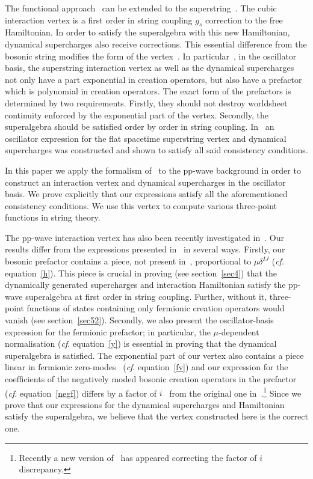 \documentclass[12pt]{article}
\def\m{\mu}
\numberwithin{equation}{section} \setlength{\textwidth}{17cm}
\begin{document}
\noindent The functional approach~\cite{Mand,KK} can be extended to the superstring~\cite{Mandsusy,gs,gsb}. 
The cubic interaction vertex is a first order in string coupling $g_s$ 
correction to the free Hamiltonian. In order to
satisfy the superalgebra with this new Hamiltonian, dynamical supercharges also receive corrections. This
essential difference from the bosonic string modifies the form of the vertex~\cite{gs,gsb}. In particular~\cite{gsb}, 
in the
oscillator basis, the superstring interaction vertex as well as the dynamical supercharges
not only have a part exponential in creation operators, but
also have a prefactor which is polynomial in creation operators.
The exact form of the prefactors is determined
by two requirements. Firstly, they should not destroy worldsheet continuity enforced by the
exponential part of the vertex.
Secondly, the superalgebra should be satisfied order by order in string coupling.
In~\cite{gsb} an oscillator expression for the flat spacetime superstring vertex and dynamical supercharges was 
constructed and shown to satisfy all said consistency conditions.

\noindent In this paper we apply the formalism of~\cite{CG,gs,gsb} to the pp-wave background in order
to construct an interaction vertex and dynamical supercharges in the oscillator basis. We prove explicitly that our
expressions satisfy all the aforementioned consistency conditions. We use this vertex to compute various
three-point functions in string theory.

\noindent The pp-wave interaction vertex has also been recently investigated in~\cite{sv,sv2}. Our results differ
from the expressions presented in~\cite{sv,sv2} in several ways. Firstly, our bosonic prefactor contains 
a piece, not present in~\cite{sv,sv2}, proportional to $\mu\delta^{IJ}$ ({\it cf}. equation~\eqref{h}). 
This piece is crucial in proving (see section~\ref{sec4}) that
the dynamically generated supercharges and interaction Hamiltonian satisfy the pp-wave superalgebra at first
order in string coupling. Further, without it, three-point functions of states containing only fermionic
creation operators would vanish (see section~\ref{sec52}). Secondly, we also present the oscillator-basis 
expression for the fermionic prefactor; in particular, the $\m$-dependent normalisation ({\it cf}. equation~\eqref{y}) 
is essential in 
proving that the dynamical superalgebra is satisfied. The exponential part of our vertex also contains a piece linear 
in fermionic zero-modes~\cite{ap} ({\it cf}. equation~\eqref{fv}) and our expression for the
coefficients of the negatively moded bosonic creation operators in the prefactor ({\it cf}. equation~\eqref{negf})
differs by a factor of $i$~\cite{ap} from the original one in~\cite{sv2}.\footnote{Recently a new version of~\cite{sv2} 
has appeared correcting the factor of $i$ discrepancy.} 
Since we prove that our expressions for the dynamical supercharges and Hamiltonian satisfy the superalgebra, we
believe that the vertex constructed here is the correct one. 
\end{document}
